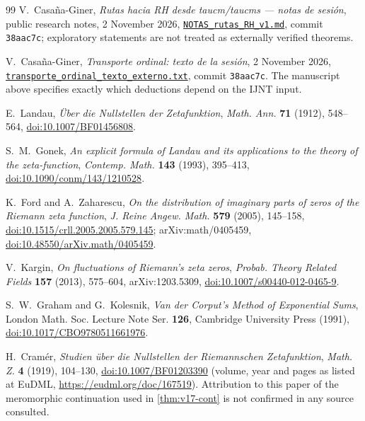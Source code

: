 \documentclass[11pt,a4paper]{article}
\numberwithin{equation}{section}
\theoremstyle{definition}
\theoremstyle{remark}
\begin{document}
\begin{thebibliography}{99}
V.~Casa\~na-Giner, \emph{Rutas hacia RH desde taucm/taucms --- notas de sesi\'on},
public research notes, 2 November 2026,
\href{https://github.com/vcasana1/prueba/blob/38aac7c/KC_tauC_2026-11-02/v10_rutas_RH/NOTAS_rutas_RH_v1.md}{\texttt{NOTAS\_rutas\_RH\_v1.md}},
commit \texttt{38aac7c}; exploratory statements are not treated as externally verified theorems.

V.~Casa\~na-Giner, \emph{Transporte ordinal: texto de la sesi\'on},
2 November 2026,
\href{https://github.com/vcasana1/prueba/blob/38aac7c/KC_tauC_2026-11-02/v10_rutas_RH/transporte_ordinal_texto_externo.txt}{\texttt{transporte\_ordinal\_texto\_externo.txt}},
commit \texttt{38aac7c}. The manuscript above specifies exactly which deductions depend on the IJNT input.

E.~Landau, \emph{\"Uber die Nullstellen der Zetafunktion}, \emph{Math. Ann.} \textbf{71} (1912), 548--564, \href{https://doi.org/10.1007/BF01456808}{doi:10.1007/BF01456808}.

S.~M.~Gonek, \emph{An explicit formula of Landau and its applications to the theory of the zeta-function}, \emph{Contemp. Math.} \textbf{143} (1993), 395--413, \href{https://doi.org/10.1090/conm/143/1210528}{doi:10.1090/conm/143/1210528}.

K.~Ford and A.~Zaharescu, \emph{On the distribution of imaginary parts of zeros of the Riemann zeta function}, \emph{J. Reine Angew. Math.} \textbf{579} (2005), 145--158, \href{https://doi.org/10.1515/crll.2005.2005.579.145}{doi:10.1515/crll.2005.2005.579.145}; arXiv:math/0405459, \href{https://doi.org/10.48550/arXiv.math/0405459}{doi:10.48550/arXiv.math/0405459}.

V.~Kargin, \emph{On fluctuations of Riemann's zeta zeros}, \emph{Probab. Theory Related Fields} \textbf{157} (2013), 575--604, arXiv:1203.5309, \href{https://doi.org/10.1007/s00440-012-0465-9}{doi:10.1007/s00440-012-0465-9}.

S.~W.~Graham and G.~Kolesnik, \emph{Van der Corput's Method of Exponential Sums}, London Math. Soc. Lecture Note Ser. \textbf{126}, Cambridge University Press (1991), \href{https://doi.org/10.1017/CBO9780511661976}{doi:10.1017/CBO9780511661976}.


H.~Cram\'er, \emph{Studien \"uber die Nullstellen der Riemannschen Zetafunktion}, \emph{Math. Z.} \textbf{4} (1919), 104--130, \href{https://doi.org/10.1007/BF01203390}{doi:10.1007/BF01203390} (volume, year and pages as listed at EuDML, \url{https://eudml.org/doc/167519}). Attribution to this paper of the meromorphic continuation used in \cref{thm:v17-cont} is not confirmed in any source consulted.


\end{thebibliography}
\end{document}
